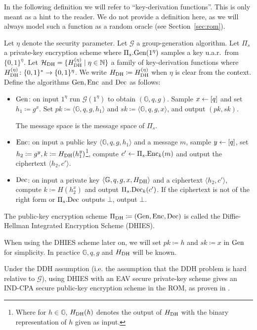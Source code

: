 In the following definition we will refer to ``key-derivation functions''. This is only meant as a hint to the reader. We do not provide a definition here, as we will always model such a function as a random oracle (see Section~\ref{sec:rom}).

\begin{definition}
	Let $\eta$ denote the security parameter. Let $\mathcal{G}$ a group-generation algorithm. Let $\Pi_s$ a private-key encryption scheme where $\Pi_s.\mathrm{Gen}(1^\eta)$ samples a key u.a.r.\ from $\{0, 1\}^\eta$. Let $\mathcal{H}_\mathrm{DH} = \{H_\mathrm{DH}^{(\eta)} \mid \eta \in \mathbb{N} \}$ a family of key-derivation functions where $H_\mathrm{DH}^{(\eta)} \colon \{0, 1\}^* \to \{0, 1\}^{\eta}$. We write $H_\mathrm{DH} \coloneqq H_\mathrm{DH}^{(\eta)}$ when $\eta$ is clear from the context. Define the algorithms $\mathrm{Gen}, \mathrm{Enc}$ and $\mathrm{Dec}$ as follows:
	\begin{itemize}
		\item $\mathrm{Gen}$: on input $1^\eta$ run $\mathcal{G}(1^\eta)$ to obtain $(\mathbb{G}, q, g)$. Sample $x \leftarrow [q]$ and set $h_1 \coloneqq g^x$. Set $pk \coloneqq \langle \mathbb{G}, q, g, h_1 \rangle$ and $sk \coloneqq \langle \mathbb{G}, q, g, x \rangle$, and output $(pk, sk)$.

		      The message space is the message space of $\Pi_s$.
		\item $\mathrm{Enc}$: on input a public key $\langle \mathbb{G}, q, g, h_1 \rangle$ and a message $m$, sample $y \leftarrow [q]$, set $h_2 \coloneqq g^y, k \coloneqq H_\mathrm{DH}(h_1^y)$\footnote{Where for $h \in \mathbb{G}$, $H_\mathrm{DH}(h)$ denotes the output of $H_\mathrm{DH}$ with the binary representation of $h$ given as input.}, compute $c' \leftarrow \Pi_s.\mathrm{Enc}_k(m)$ and output the ciphertext $\langle h_2, c' \rangle$.
		\item $\mathrm{Dec}$: on input a private key $\langle \mathbb{G}, q, g, x, H_\mathrm{DH} \rangle$ and a ciphertext $\langle h_2, c' \rangle$, compute $k \coloneqq H(h_2^x)$ and output $\Pi_s.\mathrm{Dec}_k(c')$. If the ciphertext is not of the right form or $\Pi_s.\mathrm{Dec}$ outputs $\bot$, output $\bot$.
	\end{itemize}
	The public-key encryption scheme $\Pi_{\mathrm{DH}} \coloneqq (\mathrm{Gen}, \mathrm{Enc}, \mathrm{Dec})$ is called the Diffie-Hellman Integrated Encryption Scheme (DHIES).

	When using the DHIES scheme later on, we will set $pk \coloneqq h $ and $sk \coloneqq x$ in $\mathrm{Gen}$ for simplicity. In practice $\mathbb{G}, q, g$ and $H_\mathrm{DH}$ will be known.
\end{definition}

Under the DDH assumption (i.e. the assumption that the DDH problem is hard relative to $\mathcal{G}$), using DHIES with an EAV secure private-key scheme gives an IND-CPA secure public-key encryption scheme in the ROM, as proven in \cite[Theorem~12.12]{introduction-to-modern-cryptography}.
